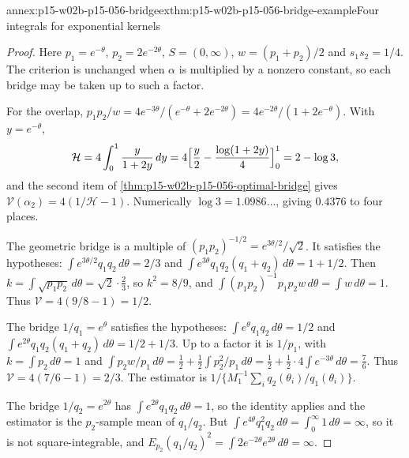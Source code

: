\begin{annexitem}{annex:p15-w02b-p15-056-bridgeex}{thm:p15-w02b-p15-056-bridge-example}{Four integrals for exponential kernels}
\begin{proof}
Here \(p_1=e^{-\theta}\), \(p_2=2e^{-2\theta}\), \(S=(0,\infty)\),
\(w=(p_1+p_2)/2\) and \(s_1s_2=1/4\). The criterion is unchanged when
\(\alpha\) is multiplied by a nonzero constant, so each bridge may be
taken up to such a factor.

For the overlap,
\(p_1p_2/w=4e^{-3\theta}/(e^{-\theta}+2e^{-2\theta})=4e^{-2\theta}/(1+2e^{-\theta})\).
With \(y=e^{-\theta}\),
\[
 \mathcal H=4\int_0^1\frac y{1+2y}\,dy
 =4\Bigl[\frac y2-\frac{\log(1+2y)}4\Bigr]_0^1=2-\log3,
\]
and the second item of \cref{thm:p15-w02b-p15-056-optimal-bridge} gives
\(\mathcal V(\alpha_2)=4(1/\mathcal H-1)\). Numerically
\(\log3=1.0986\ldots\), giving \(0.4376\) to four places.

The geometric bridge is a multiple of \((p_1p_2)^{-1/2}=e^{3\theta/2}/\sqrt2\).
It satisfies the hypotheses: \(\int e^{3\theta/2}q_1q_2\,d\theta=2/3\) and
\(\int e^{3\theta}q_1q_2(q_1+q_2)\,d\theta=1+1/2\). Then
\(k=\int\sqrt{p_1p_2}\,d\theta=\sqrt2\cdot\tfrac23\), so \(k^2=8/9\), and
\(\int(p_1p_2)^{-1}p_1p_2w\,d\theta=\int w\,d\theta=1\). Thus
\(\mathcal V=4(9/8-1)=1/2\).

The bridge \(1/q_1=e^\theta\) satisfies the hypotheses:
\(\int e^\theta q_1q_2\,d\theta=1/2\) and
\(\int e^{2\theta}q_1q_2(q_1+q_2)\,d\theta=1/2+1/3\). Up to a factor it is
\(1/p_1\), with \(k=\int p_2\,d\theta=1\) and
\(\int p_2w/p_1\,d\theta=\tfrac12+\tfrac12\int p_2^2/p_1\,d\theta
=\tfrac12+\tfrac12\cdot4\int e^{-3\theta}\,d\theta=\tfrac76\). Thus
\(\mathcal V=4(7/6-1)=2/3\). The estimator is
\(1/\{M_1^{-1}\sum_iq_2(\theta_i)/q_1(\theta_i)\}\).

The bridge \(1/q_2=e^{2\theta}\) has \(\int e^{2\theta}q_1q_2\,d\theta=1\),
so the identity applies and the estimator is the \(p_2\)-sample mean of
\(q_1/q_2\). But \(\int e^{4\theta}q_1^2q_2\,d\theta=\int_0^\infty1\,d\theta=\infty\),
so it is not square-integrable, and
\(E_{p_2}(q_1/q_2)^2=\int2e^{-2\theta}e^{2\theta}\,d\theta=\infty\).
\end{proof}
\end{annexitem}

